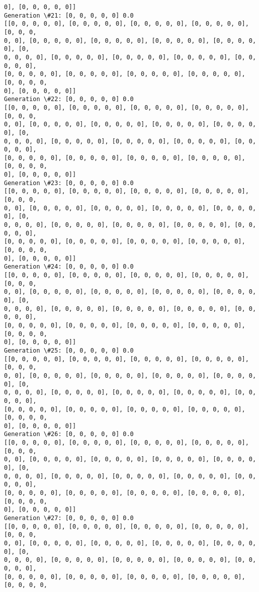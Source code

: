 \documentclass[11pt]{article}
\begin{document}
\begin{Verbatim}[commandchars=\\\{\}]
0], [0, 0, 0, 0, 0]]
Generation \#21: [0, 0, 0, 0, 0] 0.0
[[0, 0, 0, 0, 0], [0, 0, 0, 0, 0], [0, 0, 0, 0, 0], [0, 0, 0, 0, 0], [0, 0, 0,
0, 0], [0, 0, 0, 0, 0], [0, 0, 0, 0, 0], [0, 0, 0, 0, 0], [0, 0, 0, 0, 0], [0,
0, 0, 0, 0], [0, 0, 0, 0, 0], [0, 0, 0, 0, 0], [0, 0, 0, 0, 0], [0, 0, 0, 0, 0],
[0, 0, 0, 0, 0], [0, 0, 0, 0, 0], [0, 0, 0, 0, 0], [0, 0, 0, 0, 0], [0, 0, 0, 0,
0], [0, 0, 0, 0, 0]]
Generation \#22: [0, 0, 0, 0, 0] 0.0
[[0, 0, 0, 0, 0], [0, 0, 0, 0, 0], [0, 0, 0, 0, 0], [0, 0, 0, 0, 0], [0, 0, 0,
0, 0], [0, 0, 0, 0, 0], [0, 0, 0, 0, 0], [0, 0, 0, 0, 0], [0, 0, 0, 0, 0], [0,
0, 0, 0, 0], [0, 0, 0, 0, 0], [0, 0, 0, 0, 0], [0, 0, 0, 0, 0], [0, 0, 0, 0, 0],
[0, 0, 0, 0, 0], [0, 0, 0, 0, 0], [0, 0, 0, 0, 0], [0, 0, 0, 0, 0], [0, 0, 0, 0,
0], [0, 0, 0, 0, 0]]
Generation \#23: [0, 0, 0, 0, 0] 0.0
[[0, 0, 0, 0, 0], [0, 0, 0, 0, 0], [0, 0, 0, 0, 0], [0, 0, 0, 0, 0], [0, 0, 0,
0, 0], [0, 0, 0, 0, 0], [0, 0, 0, 0, 0], [0, 0, 0, 0, 0], [0, 0, 0, 0, 0], [0,
0, 0, 0, 0], [0, 0, 0, 0, 0], [0, 0, 0, 0, 0], [0, 0, 0, 0, 0], [0, 0, 0, 0, 0],
[0, 0, 0, 0, 0], [0, 0, 0, 0, 0], [0, 0, 0, 0, 0], [0, 0, 0, 0, 0], [0, 0, 0, 0,
0], [0, 0, 0, 0, 0]]
Generation \#24: [0, 0, 0, 0, 0] 0.0
[[0, 0, 0, 0, 0], [0, 0, 0, 0, 0], [0, 0, 0, 0, 0], [0, 0, 0, 0, 0], [0, 0, 0,
0, 0], [0, 0, 0, 0, 0], [0, 0, 0, 0, 0], [0, 0, 0, 0, 0], [0, 0, 0, 0, 0], [0,
0, 0, 0, 0], [0, 0, 0, 0, 0], [0, 0, 0, 0, 0], [0, 0, 0, 0, 0], [0, 0, 0, 0, 0],
[0, 0, 0, 0, 0], [0, 0, 0, 0, 0], [0, 0, 0, 0, 0], [0, 0, 0, 0, 0], [0, 0, 0, 0,
0], [0, 0, 0, 0, 0]]
Generation \#25: [0, 0, 0, 0, 0] 0.0
[[0, 0, 0, 0, 0], [0, 0, 0, 0, 0], [0, 0, 0, 0, 0], [0, 0, 0, 0, 0], [0, 0, 0,
0, 0], [0, 0, 0, 0, 0], [0, 0, 0, 0, 0], [0, 0, 0, 0, 0], [0, 0, 0, 0, 0], [0,
0, 0, 0, 0], [0, 0, 0, 0, 0], [0, 0, 0, 0, 0], [0, 0, 0, 0, 0], [0, 0, 0, 0, 0],
[0, 0, 0, 0, 0], [0, 0, 0, 0, 0], [0, 0, 0, 0, 0], [0, 0, 0, 0, 0], [0, 0, 0, 0,
0], [0, 0, 0, 0, 0]]
Generation \#26: [0, 0, 0, 0, 0] 0.0
[[0, 0, 0, 0, 0], [0, 0, 0, 0, 0], [0, 0, 0, 0, 0], [0, 0, 0, 0, 0], [0, 0, 0,
0, 0], [0, 0, 0, 0, 0], [0, 0, 0, 0, 0], [0, 0, 0, 0, 0], [0, 0, 0, 0, 0], [0,
0, 0, 0, 0], [0, 0, 0, 0, 0], [0, 0, 0, 0, 0], [0, 0, 0, 0, 0], [0, 0, 0, 0, 0],
[0, 0, 0, 0, 0], [0, 0, 0, 0, 0], [0, 0, 0, 0, 0], [0, 0, 0, 0, 0], [0, 0, 0, 0,
0], [0, 0, 0, 0, 0]]
Generation \#27: [0, 0, 0, 0, 0] 0.0
[[0, 0, 0, 0, 0], [0, 0, 0, 0, 0], [0, 0, 0, 0, 0], [0, 0, 0, 0, 0], [0, 0, 0,
0, 0], [0, 0, 0, 0, 0], [0, 0, 0, 0, 0], [0, 0, 0, 0, 0], [0, 0, 0, 0, 0], [0,
0, 0, 0, 0], [0, 0, 0, 0, 0], [0, 0, 0, 0, 0], [0, 0, 0, 0, 0], [0, 0, 0, 0, 0],
[0, 0, 0, 0, 0], [0, 0, 0, 0, 0], [0, 0, 0, 0, 0], [0, 0, 0, 0, 0], [0, 0, 0, 0,

\end{Verbatim}
\end{document}
